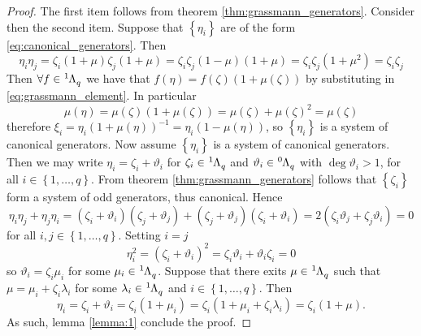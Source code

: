 \documentclass{article}
\theoremstyle{definition}
\begin{document}
\begin{proof}
    The first item follows from theorem \ref{thm:grassmann_generators}. Consider then the second item. Suppose that $\left\{ \eta_i \right\}$ are of the form \eqref{eq:canonical_generators}. Then
    \begin{equation*}
        \eta_i \eta_j = \zeta_i (1 + \mu) \zeta_j (1 + \mu)
        = \zeta_i \zeta_j ( 1 - \mu) (1 + \mu)
        = \zeta_i \zeta_j (1 + \mu^2) = \zeta_i \zeta_j
    \end{equation*}
    Then $\forall f \in \tensor[^1]{\Lambda}{_q}$ we have that $f(\eta) = f(\zeta)(1 + \mu(\zeta))$ by substituting in \eqref{eq:grassmann_element}. In particular
    \begin{equation*}
        \mu(\eta) = \mu(\zeta)(1 + \mu(\zeta)) = \mu(\zeta) + \mu(\zeta)^2 = \mu(\zeta)
    \end{equation*}
    therefore $\xi_i = \eta_i(1 + \mu(\eta))^{-1} = \eta_i (1 - \mu(\eta))$, so $\left\{ \eta_i \right\}$ is a system of canonical generators. Now assume $\left\{ \eta_i \right\}$ is a system of canonical generators. Then we may write $\eta_i = \zeta_i + \vartheta_i$ for $\zeta_i \in \tensor[^1]{\Lambda}{_q}$ and $\vartheta_i \in \tensor[^0]{\Lambda}{_q}$ with $\deg \vartheta_i > 1$, for all $i \in \left\{ 1, \dots, q \right\}$. From theorem \ref{thm:grassmann_generators} follows that $\left\{ \zeta_i \right\}$ form a system of odd generators, thus canonical. Hence
    \begin{equation*}
        \eta_i \eta_j + \eta_j \eta_i = (\zeta_i + \vartheta_i)(\zeta_j + \vartheta_j) + (\zeta_j + \vartheta_j)(\zeta_i + \vartheta_i)
        = 2 (\zeta_i \vartheta_j + \zeta_j \vartheta_i) = 0
    \end{equation*}
    for all $i, j \in \left\{ 1, \dots, q \right\}$. Setting $i = j$
    \begin{equation*}
        \eta_i^2 = (\zeta_i + \vartheta_i)^2 = \zeta_i \vartheta_i + \vartheta_i \zeta_i = 0
    \end{equation*}
    so $\vartheta_i = \zeta_i \mu_i$ for some $\mu_i \in \tensor[^1]{\Lambda}{_q}$. Suppose that there exits $\mu \in \tensor[^1]{\Lambda}{_q}$ such that $\mu = \mu_i + \zeta_i \lambda_i$ for some $\lambda_i \in \tensor[^1]{\Lambda}{_q}$ and $i \in \left\{ 1, \dots, q \right\}$. Then
    \begin{equation*}
        \eta_i = \zeta_i + \vartheta_i = \zeta_i (1 + \mu_i)
        = \zeta_i (1 + \mu_i + \zeta_i \lambda_i) = \zeta_i (1 + \mu).
    \end{equation*}
    As such, lemma \eqref{lemma:1} conclude the proof.
\end{proof}
\end{document}
